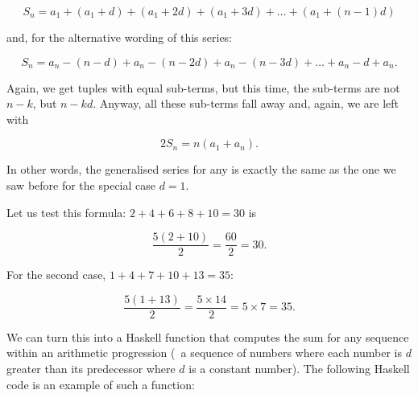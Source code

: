 \documentclass{scrreprt}
\begin{document}
\begin{equation}
S_n = a_1 + (a_1 + d) + (a_1 + 2d) + (a_1 + 3d) + \dots + (a_1 + (n-1)d)
\end{equation}

and, for the alternative wording of this series:

\begin{equation}
S_n = a_n - (n-d) + a_n - (n-2d) + a_n - (n-3d) + \dots + a_n - d + a_n.
\end{equation}

Again, we get tuples with equal sub-terms, but this time, the sub-terms
are not $n-k$, but $n-kd$. Anyway, all these sub-terms fall away and,
again, we are left with 

\begin{equation}
2S_n = n(a_1 + a_n).
\end{equation}

In other words, the generalised series for 
any 
is exactly the same as the one we saw before for the 
special case $d=1$.

Let us test this formula: $2+4+6+8+10=30$ is

\[
\frac{5(2+10)}{2} = \frac{60}{2} = 30.
\]

For the second case, $1+4+7+10+13=35$:

\[
\frac{5(1+13)}{2} = \frac{5\times 14}{2} = 5\times 7 = 35.
\]

We can turn this into a Haskell function that
computes the sum for any sequence within an arithmetic progression
(\ie\ a sequence of numbers where each number is $d$ greater
than its predecessor where $d$ is a constant number).
The following Haskell code is an example of such a function:
\end{document}
